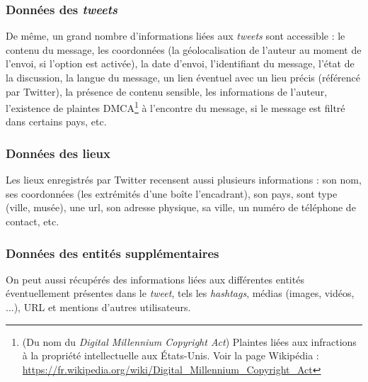         \subsubsection{Données des \emph{tweets}}
            De même, un grand nombre d'informations liées aux \emph{tweets} sont accessible : le contenu du message, les coordonnées (la géolocalisation de l'auteur au moment de l'envoi, si l'option est activée), la date d'envoi, l'identifiant du message, l'état de la discussion, la langue du message, un lien éventuel avec un lieu précis (référencé par Twitter), la présence de contenu sensible, les informations de l'auteur, l'existence de plaintes DMCA\footnote{(Du nom du \emph{Digital Millennium Copyright Act}) Plaintes liées aux infractions à la propriété intellectuelle aux États-Unis. Voir la page Wikipédia : \url{https://fr.wikipedia.org/wiki/Digital_Millennium_Copyright_Act}} à l'encontre du message, si le message est filtré dans certains pays, etc.
            
        \subsubsection{Données des lieux}
            Les lieux enregistrés par Twitter recensent aussi plusieurs informations  : son nom, ses coordonnées (les extrémités d'une boîte l'encadrant), son pays, sont type (ville, musée), une url, son adresse physique, sa ville, un numéro de téléphone de contact, etc.
        
        \subsubsection{Données des entités supplémentaires}
            On peut aussi récupérés des informations liées aux différentes entités éventuellement présentes dans le \emph{tweet}, tels les \emph{hashtags}, médias (images, vidéos, ...), URL et mentions d'autres utilisateurs.
        
        
        
        
        
        
        